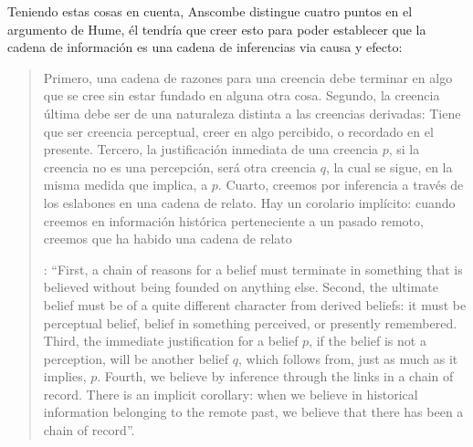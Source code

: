 Teniendo estas cosas en cuenta, Anscombe distingue cuatro puntos en el argumento de Hume, él tendría que creer esto para poder establecer que la cadena de información es una cadena de inferencias via causa y efecto: \blockquote[{\Cite[88]{anscombe1981parmenides:humeandjulius}}: \enquote{First, a chain of reasons for a belief must terminate in something that is believed without being founded on anything else. Second, the ultimate belief must be of a quite different character from derived beliefs: it must be perceptual belief, belief in something perceived, or presently remembered. Third, the immediate justification for a belief $p$, if the belief is not a perception, will be another belief $q$, which follows from, just as much as it implies, $p$. Fourth, we believe by inference through the links in a chain of record.   There is an implicit corollary: when we believe in historical information belonging to the remote past, we believe that there has been a chain of record}.]{Primero, una cadena de razones para una creencia debe terminar en algo que se cree sin estar fundado en alguna otra cosa. Segundo, la creencia última debe ser de una naturaleza distinta a las creencias derivadas: Tiene que ser creencia perceptual, creer en algo percibido, o recordado en el presente. Tercero, la justificación inmediata de una creencia $p$, si la creencia no es una percepción, será otra creencia $q$, la cual se sigue, en la misma medida que implica, a $p$. Cuarto, creemos por inferencia a través de los eslabones en una cadena de relato. Hay un corolario implícito: cuando creemos en información histórica perteneciente a un pasado remoto, creemos que ha habido una cadena de relato}.

